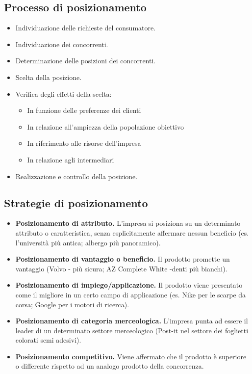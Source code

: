 \subsection{Processo di posizionamento}
\begin{itemize}
	\item Individuazione delle richieste del consumatore.
	\item Individuazione dei concorrenti.
	\item Determinazione delle posizioni dei concorrenti.
	\item Scelta della posizione.
	\item Verifica degli effetti della scelta:
	\begin{itemize}
		\item In funzione delle preferenze dei clienti
		\item In relazione all’ampiezza della popolazione obiettivo
		\item In riferimento alle risorse dell’impresa
		\item In relazione agli intermediari
	\end{itemize}
	\item Realizzazione e controllo della posizione.
\end{itemize}

\subsection{Strategie di posizionamento}
\begin{itemize}
	\item \textbf{Posizionamento di attributo.} L’impresa si posiziona su un determinato attributo o caratteristica, senza esplicitamente affermare nessun beneficio (es. l’università più antica; albergo più panoramico).
	\item \textbf{Posizionamento di vantaggio o beneficio.} Il prodotto promette un vantaggio (Volvo - più sicura; AZ Complete White -denti più bianchi).
	\item \textbf{Posizionamento di impiego/applicazione.} Il prodotto viene presentato come il migliore in un certo campo di applicazione (es. Nike per le scarpe da corsa; Google per i motori di ricerca).
	\item \textbf{Posizionamento di categoria merceologica.} L’impresa punta ad essere il leader di un determinato settore merceologico (Post-it nel settore dei foglietti colorati semi adesivi).
	\item \textbf{Posizionamento competitivo.} Viene affermato che il prodotto è superiore o differente rispetto ad un analogo prodotto della concorrenza.
\end{itemize}

